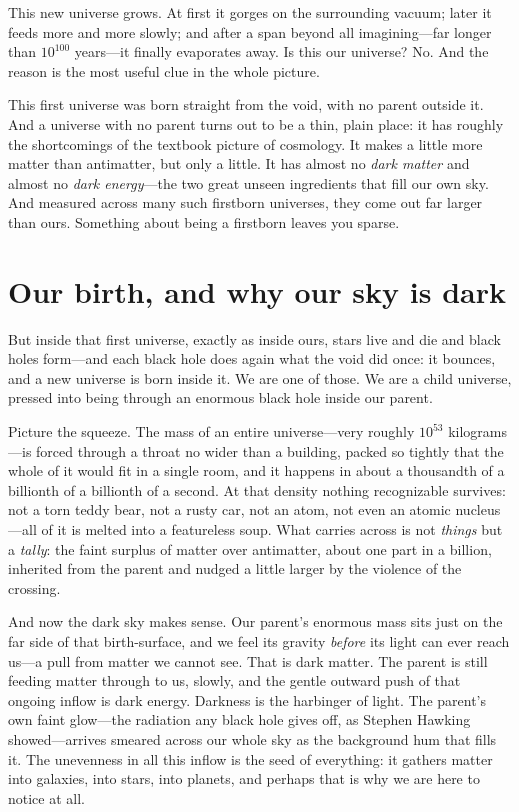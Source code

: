 This new universe grows. At first it gorges on the surrounding vacuum; later it
feeds more and more slowly; and after a span beyond all imagining---far longer
than $10^{100}$ years---it finally evaporates away. Is this our universe? No. And
the reason is the most useful clue in the whole picture.

This first universe was born straight from the void, with no parent outside it.
And a universe with no parent turns out to be a thin, plain place: it has roughly
the shortcomings of the textbook picture of cosmology. It makes a little more
matter than antimatter, but only a little. It has almost no \emph{dark matter} and
almost no \emph{dark energy}---the two great unseen ingredients that fill our own
sky. And measured across many such firstborn universes, they come out far larger
than ours. Something about being a firstborn leaves you sparse.

\section*{Our birth, and why our sky is dark}

But inside that first universe, exactly as inside ours, stars live and die and
black holes form---and each black hole does again what the void did once: it
bounces, and a new universe is born inside it. We are one of those. We are a child
universe, pressed into being through an enormous black hole inside our parent.

Picture the squeeze. The mass of an entire universe---very roughly $10^{53}$
kilograms---is forced through a throat no wider than a building, packed so tightly
that the whole of it would fit in a single room, and it happens in about a
thousandth of a billionth of a billionth of a second. At that density nothing
recognizable survives: not a torn teddy bear, not a rusty car, not an atom, not
even an atomic nucleus---all of it is melted into a featureless soup. What carries
across is not \emph{things} but a \emph{tally}: the faint surplus of matter over
antimatter, about one part in a billion, inherited from the parent and nudged a
little larger by the violence of the crossing.

And now the dark sky makes sense. Our parent's enormous mass sits just on the far
side of that birth-surface, and we feel its gravity \emph{before} its light can
ever reach us---a pull from matter we cannot see. That is dark matter. The parent
is still feeding matter through to us, slowly, and the gentle outward push of that
ongoing inflow is dark energy. Darkness is the harbinger of light. The parent's
own faint glow---the radiation any black hole gives off, as Stephen Hawking
showed---arrives smeared across our whole sky as the background hum that fills it.
The unevenness in all this inflow is the seed of everything: it gathers matter
into galaxies, into stars, into planets, and perhaps that is why we are here to
notice at all.

